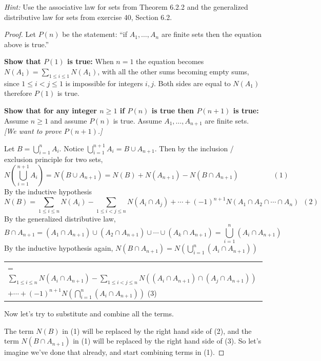 \documentclass[14pt]{extarticle}
\newcommand{\dps}{\displaystyle}
\begin{document}
{\it Hint:} Use the associative law for sets from Theorem 6.2.2 and the generalized distributive law for sets from 
exercise 40, Section 6.2.

\begin{proof}
Let \(P(n)\) be the statement: ``if \(A_1, \ldots, A_n\) are finite sets then the equation above is true.''

{\bf Show that \(P(1)\) is true:} When \(n=1\) the equation becomes \(N(A_1) = \sum_{1 \leq i \leq 1} N(A_1)\), with 
all the other sums becoming empty sums, since \(1 \leq i < j \leq 1\) is impossible for integers $i,j$. Both sides are
equal to \(N(A_1)\) therefore $P(1)$ is true.

{\bf Show that for any integer \(n \geq 1\) if \(P(n)\) is true then \(P(n+1)\) is true:} Assume \(n \geq 1\) and 
assume \(P(n)\) is true. Assume \(A_1, \ldots, A_{n+1}\) are finite sets. {\it [We want to prove \(P(n+1)\).]}

Let \(B = \bigcup_{i=1}^n A_i\). Notice \(\bigcup_{i=1}^{n+1}A_i = B \cup A_{n+1}\). Then by the inclusion / exclusion principle for two sets,
\[
N\left(\bigcup_{i=1}^{n+1}A_i\right) = N(B \cup A_{n+1}) = N(B) + N(A_{n+1}) - N(B \cap A_{n+1}) \hspace{2cm} (1)
\]
By the inductive hypothesis
\[
N(B) = \sum_{1 \leq i \leq n} N(A_i) - \sum_{1 \leq i < j \leq n} N(A_i \cap A_j) + \cdots + (-1)^{n+1} N(A_1 \cap A_2 \cap \cdots \cap A_n) \,\,\, (2)
\]
By the generalized distributive law,
\[
B \cap A_{n+1} = (A_1 \cap A_{n+1}) \cup (A_2 \cap A_{n+1}) \cup \cdots \cup (A_k \cap A_{n+1}) = \bigcup_{i=1}^{n} 
(A_i \cap A_{n+1})
\]
By the inductive hypothesis again, \(N(B \cap A_{n+1}) = N\left(\bigcup_{i=1}^{n} (A_i \cap A_{n+1}) \right)\)
\begin{center}
\begin{tabular}{l}
= \(\dps \sum_{1 \leq i \leq n} N(A_i \cap A_{n+1}) - \sum_{1 \leq i < j \leq n} N((A_i \cap A_{n+1}) \cap 
(A_j \cap A_{n+1}))\) \\
\(\dps + \cdots + (-1)^{n+1}N\left(\bigcap_{i=1}^n (A_i \cap A_{n+1})\right)\) \hspace{4cm} (3)
\end{tabular}
\end{center}
Now let's try to substitute and combine all the terms. 

The term \(N(B)\) in (1) will be replaced by the right hand side of (2), and the term \(N(B \cap A_{n+1})\) in (1) will
be replaced by the right hand side of (3). So let's imagine we've done that already, and start combining terms in (1).


\end{proof}
\end{document}
